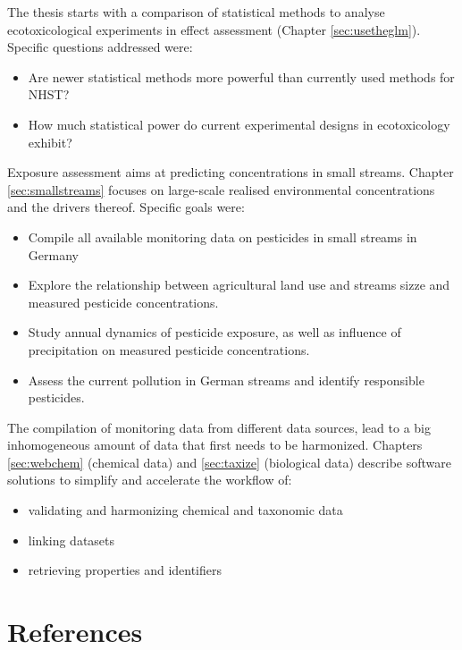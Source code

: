 \noindent The thesis starts with a comparison of statistical methods to analyse ecotoxicological experiments in effect assessment (Chapter \ref{sec:usetheglm}). 
Specific questions addressed were:

\begin{itemize}
	\item Are newer statistical methods more powerful than currently used methods for NHST?
	\item How much statistical power do current experimental designs in ecotoxicology exhibit?
\end{itemize}


\noindent Exposure assessment aims at predicting concentrations in small streams. 
Chapter \ref{sec:smallstreams} focuses on large-scale realised environmental concentrations and the drivers thereof. 
Specific goals were:
\begin{itemize}
	\item Compile all available monitoring data on pesticides in small streams in Germany
	\item Explore the relationship between agricultural land use and streams sizze and measured pesticide concentrations.
	\item Study annual dynamics of pesticide exposure, as well as influence of precipitation on measured pesticide concentrations.
	\item Assess the current pollution in German streams and identify responsible pesticides.
\end{itemize}

\noindent
The compilation of monitoring data from different data sources, lead to a big inhomogeneous amount of data that first needs to be harmonized.
Chapters \ref{sec:webchem} (chemical data) and \ref{sec:taxize} (biological data) describe software solutions to simplify and accelerate the workflow of:

\begin{itemize}
	\item validating and harmonizing chemical and taxonomic data
	\item linking datasets
	\item retrieving properties and identifiers
\end{itemize}






\newpage
\section{References}
\printbibliography[heading=none, sorting=nyt]
